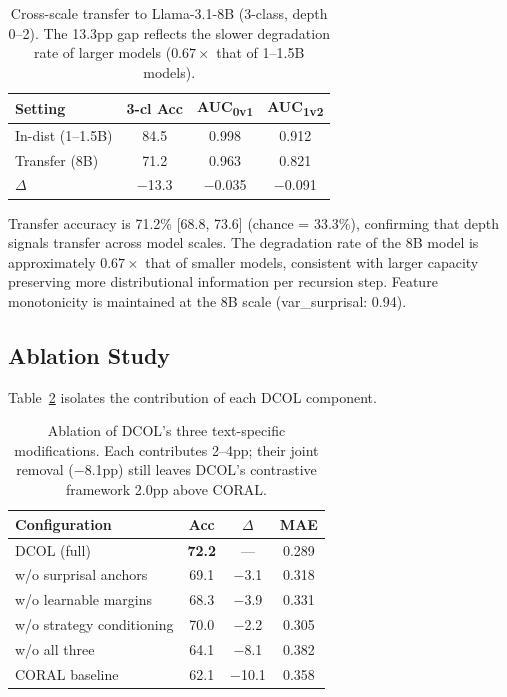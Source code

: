 \documentclass[11pt,a4paper]{article}
\newcommand{\ours}{DCOL}
\begin{document}
\begin{table}[t]
\centering
\small
\begin{tabular}{lccc}
\toprule
\textbf{Setting} & \textbf{3-cl Acc} & \textbf{AUC\textsubscript{0v1}} & \textbf{AUC\textsubscript{1v2}} \\
\midrule
In-dist (1--1.5B) & 84.5 & 0.998 & 0.912 \\
Transfer (8B)      & 71.2 & 0.963 & 0.821 \\
$\Delta$           & $-$13.3 & $-$0.035 & $-$0.091 \\
\bottomrule
\end{tabular}
\caption{Cross-scale transfer to Llama-3.1-8B (3-class, depth 0--2). The 13.3pp gap reflects the slower degradation rate of larger models ($0.67\times$ that of 1--1.5B models).}
\label{tab:cross_scale}
\end{table}

Transfer accuracy is 71.2\% [68.8, 73.6] (chance = 33.3\%), confirming that depth signals transfer across model scales. The degradation rate of the 8B model is approximately $0.67\times$ that of smaller models, consistent with larger capacity preserving more distributional information per recursion step. Feature monotonicity is maintained at the 8B scale (var\_surprisal: 0.94).

\subsection{Ablation Study}
\label{sec:ablation}

Table~\ref{tab:ablation} isolates the contribution of each \ours{} component.

\begin{table}[t]
\centering
\small
\begin{tabular}{lccc}
\toprule
\textbf{Configuration} & \textbf{Acc} & \textbf{$\Delta$} & \textbf{MAE} \\
\midrule
\ours{} (full)           & \textbf{72.2} & ---    & 0.289 \\
w/o surprisal anchors     & 69.1 & $-$3.1 & 0.318 \\
w/o learnable margins     & 68.3 & $-$3.9 & 0.331 \\
w/o strategy conditioning & 70.0 & $-$2.2 & 0.305 \\
w/o all three             & 64.1 & $-$8.1 & 0.382 \\
\midrule
CORAL baseline            & 62.1 & $-$10.1 & 0.358 \\
\bottomrule
\end{tabular}
\caption{Ablation of \ours{}'s three text-specific modifications. Each contributes 2--4pp; their joint removal ($-$8.1pp) still leaves \ours{}'s contrastive framework 2.0pp above CORAL.}
\label{tab:ablation}
\end{table}
\end{document}
